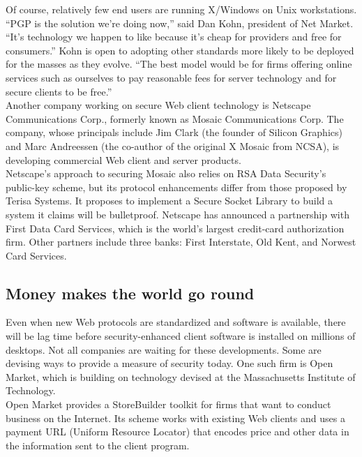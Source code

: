 Of course, relatively few end users are running X/Windows on Unix
workstations. ``PGP is the solution we're doing now,'' said Dan Kohn,
president of Net Market. ``It's technology we happen to like because
it's cheap for providers and free for consumers.'' Kohn is open to
adopting other standards more likely to be deployed for the masses as
they evolve. ``The best model would be for firms offering online
services such as ourselves to pay reasonable fees for server technology
and for secure clients to be free.''\\

Another company working on secure Web client technology is Netscape
Communications Corp., formerly known as Mosaic Communications Corp. The
company, whose principals include Jim Clark (the founder of Silicon
Graphics) and Marc Andreessen (the co-author of the original X Mosaic
from NCSA), is developing commercial Web client and server products.\\

Netscape's approach to securing Mosaic also relies on RSA Data
Security's public-key scheme, but its protocol enhancements differ from
those proposed by Terisa Systems. It proposes to implement a Secure
Socket Library to build a system it claims will be bulletproof.
Netscape has announced a partnership with First Data Card Services,
which is the world's largest credit-card authorization firm. Other
partners include three banks: First Interstate, Old Kent, and Norwest
Card Services.

\subsection{Money makes the world go round}
Even when new Web protocols are standardized and software is available,
there will be lag time before security-enhanced client software is
installed on millions of desktops. Not all companies are waiting for
these developments. Some are devising ways to provide a measure of
security today. One such firm is Open Market, which is building on
technology devised at the Massachusetts Institute of Technology.\\

Open Market provides a StoreBuilder toolkit for firms that want to
conduct business on the Internet. Its scheme works with existing Web
clients and uses a payment URL (Uniform Resource Locator) that encodes
price and other data in the information sent to the client program.\\

